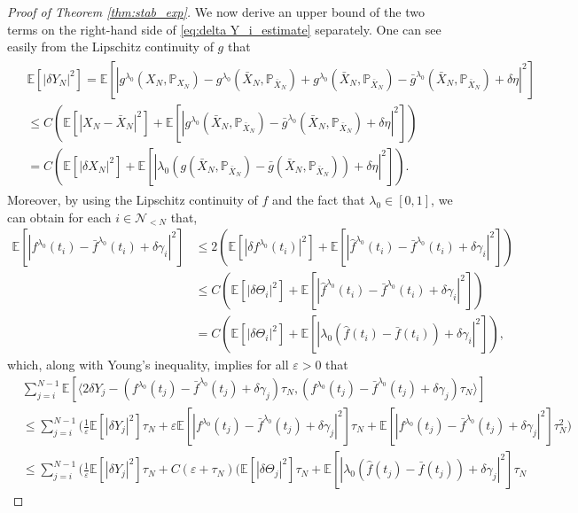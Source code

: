 \documentclass[11pt]{article}
\numberwithin{equation}{section}
\theoremstyle{definition}
\theoremstyle{remark}
\def\l{\label}  \def\f{\frac}  \def\fa{\forall}
\def\eps{\varepsilon}
\def \la{\langle} \def\ra{\rangle}
\def\cN{\mathcal{N}}
\def\sE{{\mathbb{E}}}
\def\sP{\mathbb{P}}
\begin{document}
\begin{proof}[Proof of Theorem \ref{thm:stab_exp}]
We now derive an upper bound of the two terms on the right-hand side of \eqref{eq:delta Y_i_estimate}  separately.
One can see easily  from the Lipschitz continuity of $g$ 
that 
\begin{align}\l{eq:delta Y_N_estimate}
\begin{split}
&\sE[|\delta {Y}_{N}|^2]
=\sE[|g^{\lambda_0}(X_N,\sP_{X_N})-g^{\lambda_0}(\bar{X}_N,\sP_{\bar{X}_N})
+g^{\lambda_0}(\bar{X}_N,\sP_{\bar{X}_N})-\bar{g}^{\lambda_0}(\bar{X}_N,\sP_{\bar{X}_N})
+\delta \eta|^2]
\\
&\le C(
\sE[|{X}_{N}-\bar{X}_{N}|^2]+\sE[|g^{\lambda_0}(\bar{X}_N,\sP_{\bar{X}_N})-\bar{g}^{\lambda_0}(\bar{X}_N,\sP_{\bar{X}_N})
+\delta \eta
|^2]
)
\\
&=
 C(
\sE[|\delta {X}_{N}|^2]+\sE[|\lambda_0(g(\bar{X}_N,\sP_{\bar{X}_N})-\bar{g}(\bar{X}_N,\sP_{\bar{X}_N}))
+\delta \eta
|^2]
).
\end{split}
\end{align}
Moreover, 
by using the Lipschitz continuity of $f$ 
and the fact that $\lambda_0\in [0,1]$,
we can obtain  
 for  each $i\in \cN_{<N}$ that,
\begin{align*}
\sE[|f^{\lambda_0}(t_{i})-\bar{f}^{\lambda_0}(t_{i})+\delta \gamma_i|^2]
&\le
2(\sE[ |\delta f^{\lambda_0}(t_{i})|^2]
+\sE[|\hat{f}^{\lambda_0}(t_{i})-\bar{f}^{\lambda_0}(t_{i})+\delta \gamma_i|^2])
\\
&\le 
C
(\sE[|\delta \Theta_{i}|^2]
+\sE[|\hat{f}^{\lambda_0}(t_{i})-\bar{f}^{\lambda_0}(t_{i})+\delta \gamma_i|^2])
\\
&=
C
(\sE[|\delta \Theta_{i}|^2]
+\sE[|\lambda_0(\hat{f}(t_{i})-\bar{f}(t_{i}))+\delta \gamma_i|^2]),
\end{align*}
which, along with Young's inequality, implies for all $\eps>0$ that
\begin{align*}
&\sum_{j=i}^{N-1} 
 \sE[    \la 2\delta Y_{j}-(f^{\lambda_0}(t_{j})-\bar{f}^{\lambda_0}(t_{j})+\delta \gamma_j)\tau_N, 
 (f^{\lambda_0}(t_{j})-\bar{f}^{\lambda_0}(t_{j})+\delta \gamma_j)\tau_N \ra ]
 \\ 
 &\le \sum_{j=i}^{N-1} \bigg(
 \tfrac{1}{\eps}\sE[|\delta Y_{j}|^2]\tau_N+
 \eps\sE[|f^{\lambda_0}(t_{j})-\bar{f}^{\lambda_0}(t_{j})+\delta \gamma_j|^2]\tau_N
 +\sE[|f^{\lambda_0}(t_{j})-\bar{f}^{\lambda_0}(t_{j})+\delta \gamma_j|^2]\tau_N^2
 \bigg)
\\
 &\le \sum_{j=i}^{N-1} \bigg(
 \tfrac{1}{\eps}\sE[|\delta Y_{j}|^2]\tau_N+
 C(\eps+\tau_N)
 \big(
 \sE[|\delta \Theta_{j}|^2]\tau_N
+\sE[|\lambda_0(\hat{f}(t_{j})-\bar{f}(t_{j}))+\delta \gamma_j|^2]\tau_N

\end{align*}
\end{proof}
\end{document}
